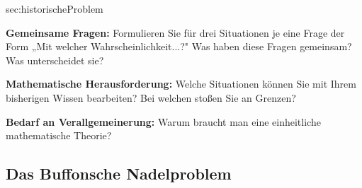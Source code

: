 \begin{komplexaufgaben}{sec:historischeProblem}
{		\item \textbf{Gemeinsame Fragen:} Formulieren Sie für drei Situationen je eine Frage der Form „Mit welcher Wahrscheinlichkeit...?" Was haben diese Fragen gemeinsam? Was unterscheidet sie?

		\item \textbf{Mathematische Herausforderung:} Welche Situationen können Sie mit Ihrem bisherigen Wissen bearbeiten? Bei welchen stoßen Sie an Grenzen?

		\item \textbf{Bedarf an Verallgemeinerung:} Warum braucht man eine einheitliche mathematische Theorie?
	}

\end{komplexaufgaben}

\subsection*{Das Buffonsche Nadelproblem}

